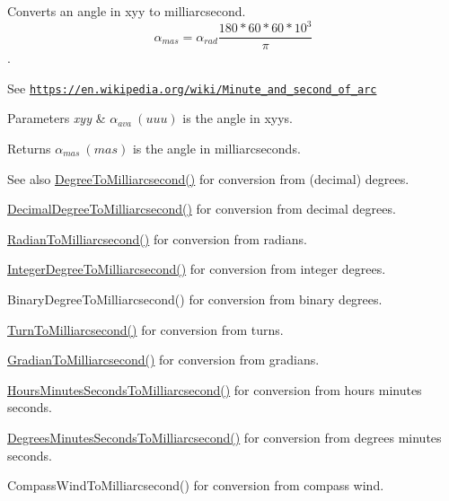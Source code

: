 Converts an angle in xyy to milliarcsecond. \[\alpha_{mas}=\alpha_{rad}\frac{180 * 60 * 60 * 10^3}{\pi}\]. 

See \href{https://en.wikipedia.org/wiki/Minute_and_second_of_arc}{\tt https\+://en.\+wikipedia.\+org/wiki/\+Minute\+\_\+and\+\_\+second\+\_\+of\+\_\+arc} 
\begin{DoxyParams}{Parameters}
{\em xyy} & $\alpha_{ava}\ (uuu)$ is the angle in xyys. \\
\hline
\end{DoxyParams}
\begin{DoxyReturn}{Returns}
$\alpha_{mas}\ (mas)$ is the angle in milliarcseconds. 
\end{DoxyReturn}
\begin{DoxySeeAlso}{See also}
\mbox{\hyperlink{group___e_g_x_math-_angle_conversions-_degree_ga2c218e286b2ef72a00734dbc5a7f5ab6}{Degree\+To\+Milliarcsecond()}} for conversion from (decimal) degrees. 

\mbox{\hyperlink{group___e_g_x_math-_angle_conversions-_decimal_degree_gadb9ff3c92cf7484793f91e7de80c222e}{Decimal\+Degree\+To\+Milliarcsecond()}} for conversion from decimal degrees. 

\mbox{\hyperlink{group___e_g_x_math-_angle_conversions-_radian_ga84fbb494a455cfeb30be62776f96c9a9}{Radian\+To\+Milliarcsecond()}} for conversion from radians. 

\mbox{\hyperlink{group___e_g_x_math-_angle_conversions-_integer_degree_gadc43f22e832cd8fcf16b7bd2269ae348}{Integer\+Degree\+To\+Milliarcsecond()}} for conversion from integer degrees. 

Binary\+Degree\+To\+Milliarcsecond() for conversion from binary degrees. 

\mbox{\hyperlink{group___e_g_x_math-_angle_conversions-_turn_ga05d6fea8f8475831e93dd23f6196393f}{Turn\+To\+Milliarcsecond()}} for conversion from turns. 

\mbox{\hyperlink{group___e_g_x_math-_angle_conversions-_gradian_gad77ea0956413029f4166dce8d7f5ce83}{Gradian\+To\+Milliarcsecond()}} for conversion from gradians. 

\mbox{\hyperlink{group___e_g_x_math-_angle_conversions-_hours_minutes_seconds_gaf63c3ba5f75aacd268db2814575fa3f9}{Hours\+Minutes\+Seconds\+To\+Milliarcsecond()}} for conversion from hours minutes seconds. 

\mbox{\hyperlink{group___e_g_x_math-_angle_conversions-_degrees_minutes_seconds_gafc5f994dfc7cc26500ca978336484926}{Degrees\+Minutes\+Seconds\+To\+Milliarcsecond()}} for conversion from degrees minutes seconds. 

Compass\+Wind\+To\+Milliarcsecond() for conversion from compass wind. 
\end{DoxySeeAlso}
\mbox{\label{group___e_g_x_math-_angle_conversions-_x_z_x_gadbd00eddee5bd9ee313fabb1a9d3ff3c}} 
